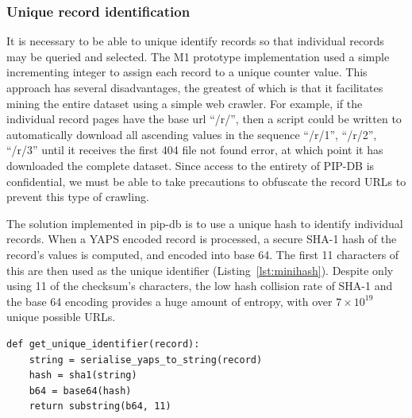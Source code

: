 \newpage

\subsubsection*{Unique record identification}

It is necessary to be able to unique identify records so that
individual records may be queried and selected. The M1 prototype
implementation used a simple incrementing integer to assign each
record to a unique counter value. This approach has several
disadvantages, the greatest of which is that it facilitates mining the
entire dataset using a simple web crawler. For example, if the
individual record pages have the base url ``/r/'', then a script could
be written to automatically download all ascending values in the
sequence ``/r/1'', ``/r/2'', ``/r/3'' until it receives the first 404
file not found error, at which point it has downloaded the complete
dataset. Since access to the entirety of PIP-DB is confidential, we
must be able to take precautions to obfuscate the record URLs to
prevent this type of crawling.

The solution implemented in pip-db is to use a unique hash to identify
individual records. When a YAPS encoded record is processed, a secure
SHA-1 hash of the record's values is computed, and encoded into base
64. The first 11 characters of this are then used as the unique
identifier (Listing~\ref{lst:minihash}). Despite only using 11 of the
checksum's characters, the low hash collision rate of SHA-1 and the
base 64 encoding provides a huge amount of entropy, with over $7
\times 10^{19}$ unique possible URLs.\\

\lstset{language=python}
\begin{lstlisting}[label=lst:minihash,caption={%
      [Pseudocode for generating unique record identifiers]
       Pseudocode for generating unique record identifiers, See
       \texttt{util.clj} for the Clojure implementation.}]
def get_unique_identifier(record):
    string = serialise_yaps_to_string(record)
    hash = sha1(string)
    b64 = base64(hash)
    return substring(b64, 11)
\end{lstlisting}


\vspace{2cm}


